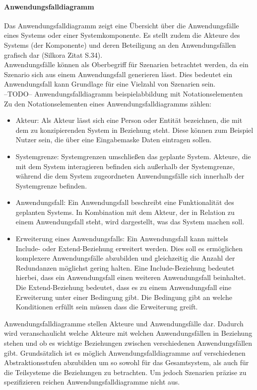 \paragraph{Anwendungsfalldiagramm}
Das Anwendungsfalldiagramm zeigt eine \"Ubersicht \"uber die Anwendungsf\"alle eines Systems oder einer Systemkomponente. Es stellt zudem die Akteure des Systems (der Komponente) und deren Beteiligung an den Anwendungsf\"allen grafisch dar (Silkora Zitat S.34). \\

Anwendungsf\"alle k\"onnen als Oberbegriff f\"ur Szenarien betrachtet werden, da ein Szenario sich aus einem Anwendungsfall generieren l\"asst. Dies bedeutet ein Anwendungsfall kann Grundlage für eine Vielzahl von Szenarien sein. \\

--TODO-- Anwendungsfalldiagramm beispielabbildung mit Notationselementen\\

Zu den Notationselementen eines Anwendungsfalldiagramms z\"ahlen:
\begin{itemize}
\item Akteur: Als Akteur l\"asst sich eine Person oder Entit\"at bezeichnen, die mit dem zu konzipierenden System in Beziehung steht. Diese k\"onnen zum Beispiel Nutzer sein, die \"uber eine Eingabemaske Daten eintragen sollen.
\item Systemgrenze: Systemgrenzen umschlie\ss{}en das geplante System. Akteure, die mit dem System interagieren befinden sich au\ss{}erhalb der Systemgrenze, w\"ahrend die dem System zugeordneten Anwendungsf\"alle sich innerhalb der Systemgrenze befinden.
\item Anwendungsfall: Ein Anwendungsfall beschreibt eine Funktionalit\"at des geplanten Systems. In Kombination mit dem Akteur, der in Relation zu einem Anwendungsfall steht, wird dargestellt, was das System machen soll.
\item Erweiterung eines Anwendungsfalls: Ein Anwendungsfall kann mittels Include- oder Extend-Beziehung erweitert werden. Dies soll es erm\"oglichen komplexere Anwendungsf\"alle abzubilden und gleichzeitig die Anzahl der Redundanzen m\"oglichst gering halten. Eine Include-Beziehung bedeutet hierbei, dass ein Anwendungsfall einen weiteren Anwendungsfall beinhaltet. Die Extend-Beziehung bedeutet, dass es zu einem Anwendungsfall eine Erweiterung unter einer Bedingung gibt. Die Bedingung gibt an welche Konditionen erfüllt sein müssen dass die Erweiterung greift.
\end{itemize}
Anwendungsfalldiagramme stellen Akteure und Anwendungsfälle dar. Dadurch wird veranschaulicht welche Akteure mit welchen Anwendungsfällen in Beziehung stehen und ob es wichtige Beziehungen zwischen verschiedenen Anwendungsfällen gibt. Grundsätzlich ist es möglich Anwendungsfalldiagramme auf verschiedenen Abstraktionsstufen abzubilden um so sowohl für das Gesamtsystem, als auch für die Teilsysteme die Beziehungen zu betrachten. Um jedoch Szenarien präzise zu spezifizieren reichen Anwendungsfalldiagramme nicht aus.\\

